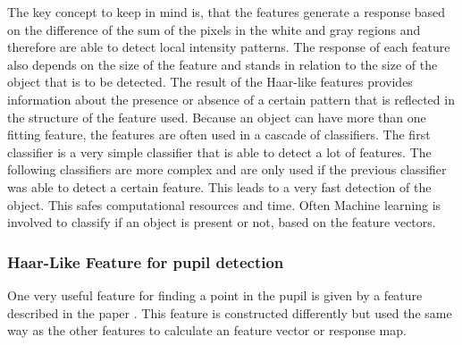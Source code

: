 The key concept to keep in mind is, that the features generate a response based on the difference of the sum of the pixels in the white and gray regions and therefore are able to detect local intensity patterns. The response of each feature also depends on the size of the feature and stands in relation to the size of the object that is to be detected. The result of the Haar-like features provides information about the presence or absence of a certain pattern that is reflected in the structure of the feature used. Because an object can have more than one fitting feature, the features are often used in a cascade of classifiers. The first classifier is a very simple classifier that is able to detect a lot of features. The following classifiers are more complex and are only used if the previous classifier was able to detect a certain feature. This leads to a very fast detection of the object. This safes computational resources and time. Often Machine learning is involved to classify if an object is present or not, based on the feature vectors. 

\subsubsection{Haar-Like Feature for pupil detection}
One very useful feature for finding a point in the pupil is given by a feature described in the paper \cite{pupil_haar}. This feature is constructed differently but used the same way as the other features to calculate an feature vector or response map. 
\begin{figure}
    \centering

\end{figure}


